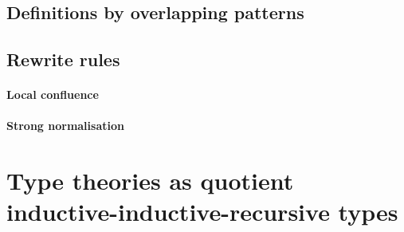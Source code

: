 \documentclass[a4paper,UKenglish,numberwithinsect,cleveref,thm-restate]{lipics-v2021}
\begin{document}
\subsection{Definitions by overlapping patterns}
\cite{Cockx2014}
\subsection{Rewrite rules}
\cite{Cockx2020,Cockx2021}
\paragraph*{Local confluence}
\paragraph*{Strong normalisation}


\section{Type theories as quotient inductive-inductive-recursive types} \label{sec:QIIRTs}
\end{document}
